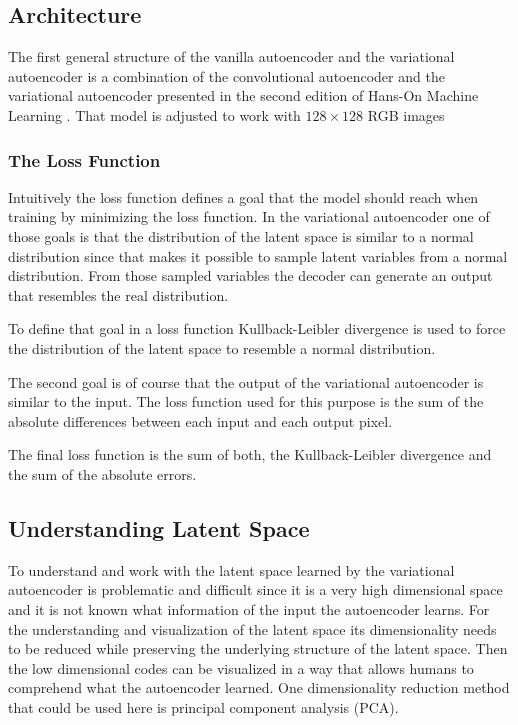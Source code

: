 \subsection{Architecture} \label{architecture}

The first general structure of the vanilla autoencoder and the variational autoencoder is a combination 
of the convolutional autoencoder and the variational autoencoder presented in the second edition of
Hans-On Machine Learning \parencite{2017-geron-homl}.
That model is adjusted to work with $128\times 128$ RGB images

\subsubsection{The Loss Function}

Intuitively the loss function defines a goal that the model should reach when training by minimizing
the loss function. In the variational autoencoder one of those goals is that the distribution of the 
latent space is similar to a normal distribution since that makes it possible to sample latent 
variables from a normal distribution. From those sampled variables the decoder can generate an output
that resembles the real distribution.

To define that goal in a loss function Kullback-Leibler divergence is used to force the distribution
of the latent space to resemble a normal distribution.

The second goal is of course that the output of the variational autoencoder is similar to the input.
The loss function used for this purpose is the sum of the absolute differences between each input and
each output pixel.

The final loss function is the sum of both, the Kullback-Leibler divergence and the sum of the absolute
errors.

\subsection{Understanding Latent Space}

To understand and work with the latent space learned by the variational autoencoder is problematic and
difficult since it is a very high dimensional space and it is not known what information of the input the
autoencoder learns. For the understanding and visualization of the latent space its dimensionality needs
to be reduced while preserving the underlying structure of the latent space. Then the low dimensional
codes can be visualized in a way that allows humans to comprehend what the autoencoder learned.
One dimensionality reduction method that could be used here is principal component analysis (PCA).

